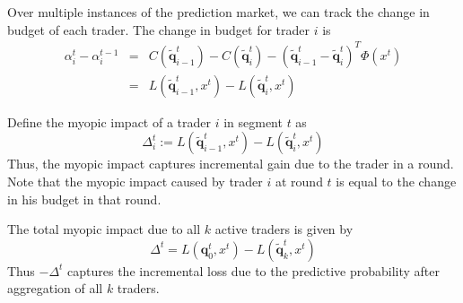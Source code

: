 \documentclass{article}
\newcommand{\qvec}{\mathbf{q}}
\begin{document}
Over multiple instances of the prediction market, we can track the change in budget of each trader. The change in budget for trader $i$ is
\begin{eqnarray*}
\alpha_{i}^{t}-\alpha_{i}^{t-1}&=&C(\tilde{\qvec}_{i-1}^{t})-C(\tilde{\qvec}_{i}^{t})-(\tilde{\qvec}_{i-1}^{t}-\tilde{\qvec}_{i}^{t})^{T}\Phi(x^{t})\\
&=&L(\tilde{\qvec}_{i-1}^{t},x^{t})-L(\tilde{\qvec}_{i}^{t},x^{t})
\end{eqnarray*}

Define the myopic impact of a trader $i$ in segment $t$ as
$$\Delta_{i}^{t}:=L(\tilde{\qvec}_{i-1}^{t},x^{t})-L(\tilde{\qvec}_{i}^{t},x^{t})$$
Thus, the myopic impact captures incremental gain due to the trader in a round. Note that the myopic impact caused by trader $i$ at round $t$ is equal to the change in his budget in that round.

The total myopic impact due to all $k$ active traders is given by
$$\Delta^{t}=L(\qvec_{0}^{t},x^{t})-L(\tilde{\qvec}_{k}^{t},x^{t})$$
Thus $-\Delta^{t}$ captures the incremental loss due to the predictive probability after aggregation of all $k$ traders. 


\end{document}
